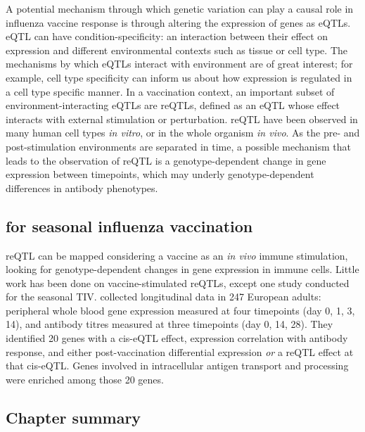 A potential mechanism through which genetic variation can play a causal role in influenza vaccine response is through altering the expression of genes as \glspl{eQTL}.
\gls{eQTL} can have condition-specificity: an interaction between their effect on expression and different environmental contexts such as tissue or cell type\autocite{albert2015RoleRegulatoryVariation,vandiedonck2017GeneticAssociationMolecular}.
The mechanisms by which \glspl{eQTL} interact with environment are of great interest;
for example, cell type specificity can inform us about how expression is regulated in a cell type specific manner\autocite{kim-hellmuth2019CellTypeSpecific}.
In a vaccination context, an important subset of environment-interacting eQTLs are \glspl{reQTL}, defined as an eQTL whose effect interacts with external stimulation or perturbation.
reQTL have been observed in many human cell types \textit{in vitro}, or in the whole organism \textit{in vivo}.
As the pre- and post-stimulation environments are separated in time, a possible mechanism that leads to the observation of reQTL is a genotype-dependent change in gene expression between timepoints,
which may underly genotype-dependent differences in antibody phenotypes.

\subsection{ for seasonal influenza vaccination}

\gls{reQTL} can be mapped considering a vaccine as an \textit{in vivo} immune stimulation, looking for genotype-dependent changes in gene expression in immune cells.
Little work has been done on vaccine-stimulated reQTLs, except one study conducted for the seasonal \gls{TIV}.
\autocite{franco2013IntegrativeGenomicAnalysis} collected longitudinal data in 247 European adults:
peripheral whole blood gene expression measured at four timepoints (day 0, 1, 3, 14), 
and antibody titres measured at three timepoints (day 0, 14, 28).
They identified 20 genes with a cis-eQTL effect, expression correlation with antibody response, and either post-vaccination differential expression \emph{or} a reQTL effect at that cis-eQTL.
Genes involved in intracellular antigen transport and processing were enriched among those 20 genes.

\subsection{Chapter summary}

